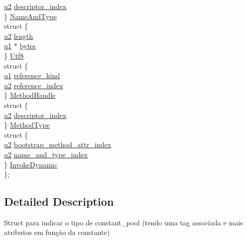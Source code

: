 \begin{DoxyCompactItemize}
\begin{tabbing}
\>\>\hyperlink{structures_8h_a55ef8d87fd202b8417704c089899c5b9}{u2} \hyperlink{structcp__info_a35ec31f117bf83ef9aef6100822f1141}{descriptor\_index}\\
\>\} \hyperlink{structcp__info_ac43e804549f01bed269b46ac2fd0efca}{NameAndType}\\
\>struct \{\\
\>\>\hyperlink{structures_8h_a55ef8d87fd202b8417704c089899c5b9}{u2} \hyperlink{structcp__info_a1df458be110c843ea49b8a8a4c9dfb91}{length}\\
\>\>\hyperlink{structures_8h_a64f8055b64cf2a4c299c841130c5c938}{u1} $\ast$ \hyperlink{structcp__info_a30f97eda54e30a923a217520316e9301}{bytes}\\
\>\} \hyperlink{structcp__info_af0b0a05e0079e3d1b0c99cd3c0e4463a}{Utf8}\\
\>struct \{\\
\>\>\hyperlink{structures_8h_a64f8055b64cf2a4c299c841130c5c938}{u1} \hyperlink{structcp__info_a13e5aa07b7aa482061b89f4d7379a2dd}{reference\_kind}\\
\>\>\hyperlink{structures_8h_a55ef8d87fd202b8417704c089899c5b9}{u2} \hyperlink{structcp__info_a946bbab9aa280d4e22194ef7b434166a}{reference\_index}\\
\>\} \hyperlink{structcp__info_a6a4f93d961e65bc33c079ba656b89884}{MethodHandle}\\
\>struct \{\\
\>\>\hyperlink{structures_8h_a55ef8d87fd202b8417704c089899c5b9}{u2} \hyperlink{structcp__info_a35ec31f117bf83ef9aef6100822f1141}{descriptor\_index}\\
\>\} \hyperlink{structcp__info_a2faf7cea4242acbc5f952567fdabfb72}{MethodType}\\
\>struct \{\\
\>\>\hyperlink{structures_8h_a55ef8d87fd202b8417704c089899c5b9}{u2} \hyperlink{structcp__info_abad11f89efc244065e72ec811f9dc929}{bootstrap\_method\_attr\_index}\\
\>\>\hyperlink{structures_8h_a55ef8d87fd202b8417704c089899c5b9}{u2} \hyperlink{structcp__info_a1b947f3ff3eee58acf5500debf45848c}{name\_and\_type\_index}\\
\>\} \hyperlink{structcp__info_a9f368f50ec505be7deadf4af55074cdd}{InvokeDynamic}\\
\}; \\

\end{tabbing}\end{DoxyCompactItemize}


\subsection{Detailed Description}
Struct para indicar o tipo de constant\+\_\+pool (tendo uma tag associada e mais atributos em função da constante)

